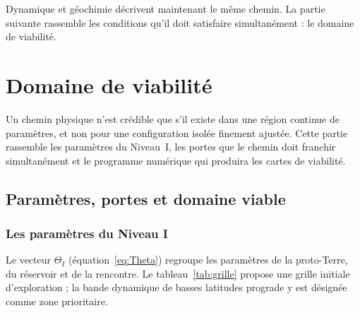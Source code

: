 \documentclass[11pt,a4paper,openany]{report}
\begin{document}
\begin{rappel}
Dynamique et géochimie décrivent maintenant le même chemin. La partie suivante rassemble les
conditions qu'il doit satisfaire simultanément : le domaine de viabilité.
\end{rappel}

\part{Domaine de viabilité}
\label{part:viabilite}

\noindent
Un chemin physique n'est crédible que s'il existe dans une région continue de paramètres, et non
pour une configuration isolée finement ajustée. Cette partie rassemble les paramètres du
Niveau~I, les portes que le chemin doit franchir simultanément et le programme numérique qui
produira les cartes de viabilité.

\chapter{Paramètres, portes et domaine viable}
\label{ch:portes}

\section{Les paramètres du Niveau I}

Le vecteur $\Theta_I$ (équation~\eqref{eq:Theta}) regroupe les paramètres de la proto-Terre, du
réservoir et de la rencontre. Le tableau~\ref{tab:grille} propose une grille initiale d'exploration ;
la bande dynamique de basses latitudes prograde y est désignée comme zone prioritaire.
\end{document}

